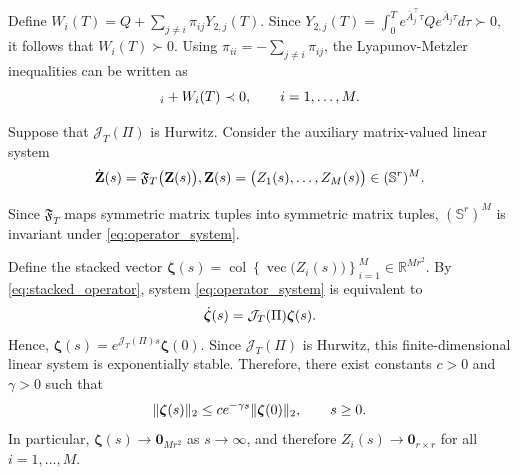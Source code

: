 \documentclass[conference]{IEEEtran}
\begin{document}
	\begin{IEEEproof}
		Define
		$
		W_i(T)
		=
		Q
		+
		\sum_{j\ne i}
		\pi_{ij}Y_{2,j}(T).
		$
		Since
		$
		Y_{2,j}(T)
		=
		\int_0^T
		e^{\bar A_j^\top\tau}
		Q
		e^{\bar A_j\tau}
		d\tau
		\succ0,
		$
		it follows that
		$
		W_i(T)\succ0.
		$
		Using $\pi_{ii}=-\sum_{j\ne i}\pi_{ij}$, the
		Lyapunov-Metzler inequalities can be written as
		\vspace{-0.2\baselineskip}
		\begin{equation}
			[\mathfrak F_T(\mathbf X)]_i
			+
			W_i(T)
			\prec0,
			\qquad
			i=1,\ldots,M.
			\label{eq:operator_LM}	
			\vspace{-0.2\baselineskip}		
		\end{equation}
		
		Suppose that $\mathcal J_T(\Pi)$ is Hurwitz. Consider the auxiliary
		matrix-valued linear system
		\vspace{-0.2\baselineskip}
		\begin{equation}
			\dot{\mathbf Z}(s)
			=
			\mathfrak F_T\bigl(\mathbf Z(s)\bigr),
			\mathbf Z(s)
			=
			\bigl(Z_1(s),\ldots,Z_M(s)\bigr)
			\in(\mathbb S^r)^M.
			\label{eq:operator_system}
			\vspace{-0.2\baselineskip}
		\end{equation}
		
		Since $\mathfrak F_T$ maps symmetric matrix tuples into
		symmetric matrix tuples, $(\mathbb S^r)^M$ is invariant under
		\eqref{eq:operator_system}.
		
		Define the stacked vector
		$
		\boldsymbol{\zeta}(s)
		=
		\operatorname{col}
		\left\{
		\operatorname{vec}\bigl(Z_i(s)\bigr)
		\right\}_{i=1}^{M}
		\in\mathbb R^{Mr^2}.
		$
		By \eqref{eq:stacked_operator}, system
		\eqref{eq:operator_system} is equivalent to
		\vspace{-0.2\baselineskip}
		\[
		\dot{\boldsymbol{\zeta}}(s)
		=
		\mathcal J_T(\Pi)
		\boldsymbol{\zeta}(s).	
		\vspace{-0.2\baselineskip}	
		\]
		Hence,
		$
		\boldsymbol{\zeta}(s)
		=
		e^{\mathcal J_T(\Pi)s}
		\boldsymbol{\zeta}(0).
		$
		Since $\mathcal J_T(\Pi)$ is Hurwitz, this finite-dimensional
		linear system is exponentially stable. Therefore, there exist
		constants $c>0$ and $\gamma>0$ such that
		\vspace{-0.2\baselineskip}
		\begin{equation}
			\|
			\boldsymbol{\zeta}(s)
			\|_2
			\leq
			ce^{-\gamma s}
			\|
			\boldsymbol{\zeta}(0)
			\|_2,
			\qquad
			s\geq0.			
			\label{eq:z_exponential_decay}
			\vspace{-0.2\baselineskip}
		\end{equation}
		In particular,
		$\boldsymbol{\zeta}(s)\to\mathbf 0_{Mr^2}$ as $s\to\infty$,
		and therefore
		$Z_i(s)\to\mathbf 0_{r\times r}$
		for all $i=1,\ldots,M$.
		

\end{IEEEproof}
\end{document}
